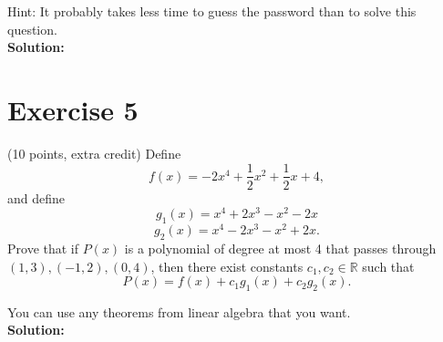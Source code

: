 \documentclass{article}
\begin{document}
Hint: It probably takes less time to guess the password than to solve this question. \\

\textbf{Solution:} \\



\newpage

\section*{Exercise 5}
(10 points, extra credit) Define
\[
f(x) = -2x^4 + \frac{1}{2}x^2 + \frac{1}{2}x + 4,
\]
and define
\[
g_1(x) = x^4 + 2x^3 - x^2 - 2x
\]
\[
g_2(x) = x^4 - 2x^3 - x^2 + 2x.
\]
Prove that if $P(x)$ is a polynomial of degree at most 4 that passes through $(1,3), (-1,2), (0,4)$, then there exist constants $c_1, c_2 \in \mathbb{R}$ such that
\[
P(x) = f(x) + c_1 g_1(x) + c_2 g_2(x).
\]

You can use any theorems from linear algebra that you want. \\

\textbf{Solution:} \\
\end{document}
